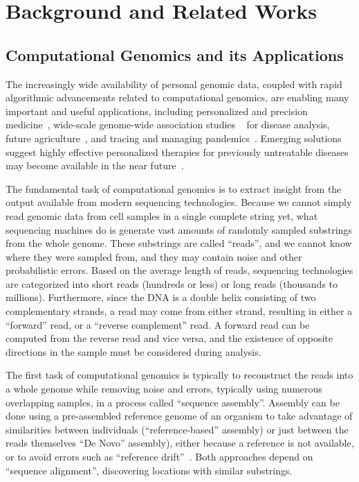 \section{Background and Related Works}
\label{sec:background}

\subsection{Computational Genomics and its Applications}

The increasingly wide availability of personal genomic data, coupled with rapid algorithmic advancements related to computational genomics, are enabling many important and useful applications, including personalized and precision medicine~\cite{nakagawa2018whole}, wide-scale genome-wide association studies
~\cite{gage2016gwascantellus,cano2020gwastofunction} for disease analysis, future agriculture~\cite{varshney2021designingfuturecrops}, and tracing and managing pandemics~\cite{sawyer2021metagenomics,racaniello2016movingbeyondmeta}.
Emerging solutions suggest highly effective personalized therapies for previously untreatable diseases may become available in the near future~\cite{ginsburg2009genomicpersonalized,offit2011personalizedmedicine}.

The fundamental task of computational genomics is to extract insight from the output available from modern sequencing technologies.
Because we cannot simply read genomic data from cell samples in a single complete string yet, what sequencing machines do is generate vast amounts of randomly sampled substrings from the whole genome.
These substrings are called ``reads'', and we cannot know where they were sampled from, and they may contain noise and other probabilistic errors.
Based on the average length of reads, sequencing technologies are categorized into short reads (hundreds or less) or long reads (thousands to millions).
Furthermore, since the DNA is a double helix consisting of two complementary strands, a read may come from either strand, resulting in either a ``forward'' read, or a ``reverse complement'' read.
A forward read can be computed from the reverse read and vice versa, and the existence of opposite directions in the sample must be considered during analysis.

The first task of computational genomics is typically to reconstruct the reads into a whole genome while removing noise and errors, typically using numerous overlapping samples, in a process called ``sequence assembly''.
Assembly can be done using a pre-assembled reference genome of an organism to take advantage of similarities between individuals (``reference-based'' assembly) or just between the reads themselves ``De Novo'' assembly), either because a reference is not available, or to avoid errors such as ``reference drift''~\cite{ashley2016towardsprecisionmedicine,chaisson2015geneticdenovo}.
Both approaches depend on ``sequence alignment'', discovering locations with similar substrings.


